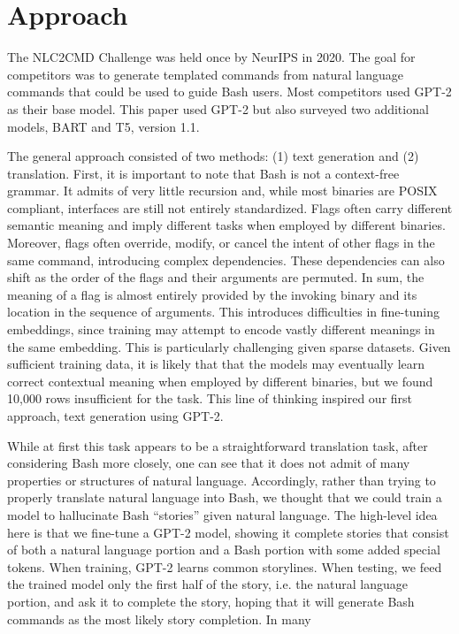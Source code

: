\documentclass{article}
\begin{document}
\section{Approach}
The NLC2CMD Challenge was held once by NeurIPS in 2020. The goal for
competitors was to generate templated commands from natural language commands
that could be used to guide Bash users. Most competitors used GPT-2 as their
base model. This paper used GPT-2 but also surveyed two additional models,
BART and T5, version 1.1.
\par
The general approach consisted of two methods: (1) text generation and (2)
translation. First, it is important to note that Bash is not a context-free
grammar. It admits of very little recursion and, while most binaries are POSIX
compliant, interfaces are still not entirely standardized. Flags often carry
different semantic meaning and imply
different tasks when employed by different binaries. Moreover, flags often
override, modify, or cancel the intent of other flags in the same command,
introducing complex dependencies. These dependencies can also shift as the
order of the flags and their arguments are permuted. In sum, the meaning of a
flag is almost entirely provided by the invoking binary and its location in the
sequence of arguments. This introduces difficulties in fine-tuning embeddings,
since training may attempt to encode
vastly different meanings in the same embedding. This is particularly
challenging given sparse datasets. Given sufficient training data, it is likely
that that the models may eventually learn correct contextual meaning when
employed by different binaries, but we found 10,000 rows insufficient for the
task. This line of thinking inspired our first approach, text generation using
GPT-2.
\par
While at first this task appears to be a straightforward translation task,
after considering Bash more closely, one can see that it does not admit of many
properties or structures of natural language. Accordingly, rather than trying
to properly translate natural language into Bash, we thought that we could
train a model to hallucinate Bash ``stories'' given natural language. The
high-level idea here is that we fine-tune a GPT-2 model, showing it complete
stories that consist of both a natural language portion and a Bash portion with
some added special tokens. When training, GPT-2 learns common storylines.
When testing, we feed the trained model only the first half of the story, i.e.
the natural language portion, and ask it to complete the story, hoping that it
will generate Bash commands as the most likely story completion. In many
\end{document}
